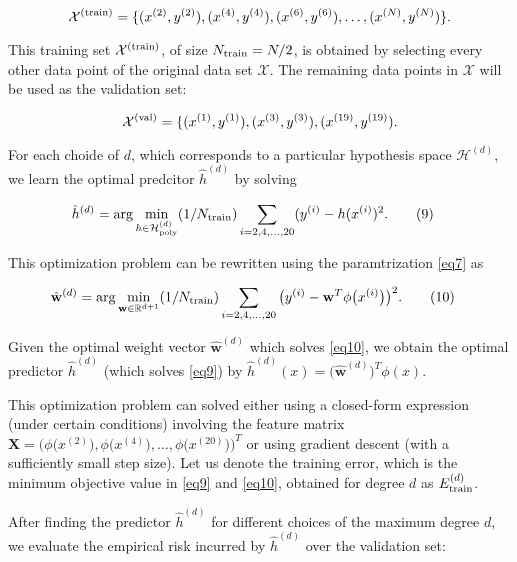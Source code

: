 \documentclass[11pt]{article}
\begin{document}
\begin{equation} 
\mathcal{X}^{(\rm train)} = \{ (x^{(2)},y^{(2)}), (x^{(4)},y^{(4)}), (x^{(6)},y^{(6)}),\ldots,(x^{(N)},y^{(N)}) \}.
\end{equation}

This training set \(\mathcal{X}^{(\rm train)}\), of size
\(N_{\rm train} = N/2\), is obtained by selecting every other data point
of the original data set \(\mathcal{X}\). The remaining data points in
\(\mathcal{X}\) will be used as the validation set:

\begin{equation} 
\mathcal{X}^{(\rm val)}= \{(x^{(1)},y^{(1)}),(x^{(3)},y^{(3)}),(x^{(19)},y^{(19)}).
\end{equation}

For each choide of \(d\), which corresponds to a particular hypothesis
space \(\mathcal{H}^{(d)}\), we learn the optimal predcitor
\(\hat{h}^{(d)}\) by solving

\begin{align}
\hat{h}^{(d)} & = {\rm arg} \min_{h \in \mathcal{H}^{(d)}_{\rm poly}} (1/N_{\rm train}) \sum_{i=2,4,\ldots,20} (y^{(i)} - h(x^{(i)})^2. 
\label{eq9}
\tag{9}
\end{align}

This optimization problem can be rewritten using the paramtrization
\eqref{eq7} as

\begin{align}
\hat{\mathbf{w}}^{(d)} & = {\rm arg} \min_{\mathbf{w} \in \mathbb{R}^{d+1}} (1/N_{\rm train}) \sum_{i=2,4,\ldots,20} \big(y^{(i)} - \mathbf{w}^{T}\phi \big(x^{(i)}\big) \big)^2. 
\label{eq10}
\tag{10}
\end{align}

Given the optimal weight vector \(\hat{\mathbf{w}}^{(d)}\) which solves
\eqref{eq10}, we obtain the optimal predictor \(\hat{h}^{(d)}\) (which
solves \eqref{eq9}) by
\(\hat{h}^{(d)}(x) = \big( \hat{\mathbf{w}}^{(d)} \big)^{T} \phi(x)\).

This optimization problem can solved either using a closed-form
expression (under certain conditions) involving the feature matrix
\(\mathbf{X}=\big(\phi\big(x^{(2)}\big),\phi\big(x^{(4)}\big),\ldots,\phi\big(x^{(20)}\big)\big)^{T}\)
or using gradient descent (with a sufficiently small step size). Let us
denote the training error, which is the minimum objective value in
\eqref{eq9} and \eqref{eq10}, obtained for degree \(d\) as
\(E_{\rm train}^{(d)}\).

After finding the predictor \(\hat{h}^{(d)}\) for different choices of
the maximum degree \(d\), we evaluate the empirical risk incurred by
\(\hat{h}^{(d)}\) over the validation set:
\end{document}
